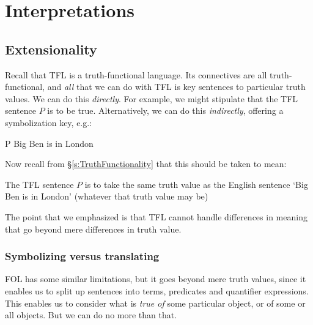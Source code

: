 \part{Interpretations}
\label{ch.semantics}


\chapter{Extensionality}\label{s:Interpretations}

Recall that TFL is a truth-functional language. Its connectives are all truth-functional, and \emph{all} that we can do with TFL is key sentences to particular truth values. We can do this \emph{directly}. For example, we might stipulate that the TFL sentence $P$ is to be true. Alternatively, we can do this \emph{indirectly}, offering a symbolization key, e.g.:
	\begin{ekey}
		\item[P] Big Ben is in London
	\end{ekey}
Now recall from \S\ref{s:TruthFunctionality} that this should be taken to mean:
	\begin{ebullet}
		\item The TFL sentence $P$ is to take the same truth value as the English sentence `Big Ben is in London' (whatever that truth value may be)
	\end{ebullet}
The point that we emphasized is that TFL cannot handle differences in meaning that go beyond mere differences in truth value.


\section{Symbolizing versus translating}
FOL has some similar limitations, but it goes beyond mere truth values, since it enables us to split up sentences into terms, predicates and quantifier expressions. This enables us to consider what is \emph{true of} some particular object, or of some or all objects. But we can do no more than that. 

